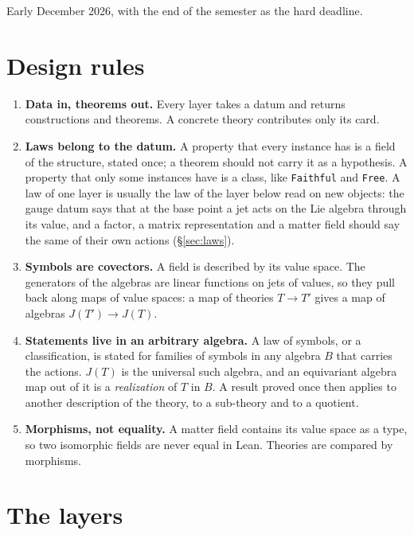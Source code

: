 \documentclass[11pt,a4paper]{article}
\makeatletter
\newcommand{\lean}[1]{{\footnotesize\upshape\ttfamily\nolinkurl{#1}}}
\renewcommand\paragraph{\@startsection{paragraph}{4}{\z@}{1.7ex \@plus .6ex \@minus .2ex}{-0.8em}{\normalfont\normalsize\bfseries}}
\makeatother
\begin{document}
\paragraph{Deadline.} Early December 2026, with the end of the semester as the hard deadline.

\section{Design rules}

\begin{enumerate}[leftmargin=*, itemsep=2pt]
\item \textbf{Data in, theorems out.} Every layer takes a datum and returns constructions and theorems. A concrete theory contributes only its card.
\item \textbf{Laws belong to the datum.} A property that every instance has is a field of the structure, stated once; a theorem should not carry it as a hypothesis. A property that only some instances have is a class, like \lean{Faithful} and \lean{Free}. A law of one layer is usually the law of the layer below read on new objects: the gauge datum says that at the base point a jet acts on the Lie algebra through its value, and a factor, a matrix representation and a matter field should say the same of their own actions (\S\ref{sec:laws}).
\item \textbf{Symbols are covectors.} A field is described by its value space. The generators of the algebras are linear functions on jets of values, so they pull back along maps of value spaces: a map of theories $T\to T'$ gives a map of algebras $J(T')\to J(T)$.
\item \textbf{Statements live in an arbitrary algebra.} A law of symbols, or a classification, is stated for families of symbols in any algebra $B$ that carries the actions. $J(T)$ is the universal such algebra, and an equivariant algebra map out of it is a \emph{realization} of $T$ in $B$. A result proved once then applies to another description of the theory, to a sub-theory and to a quotient.
\item \textbf{Morphisms, not equality.} A matter field contains its value space as a type, so two isomorphic fields are never equal in Lean. Theories are compared by morphisms.
\end{enumerate}

\section{The layers}\label{sec:layers}
\end{document}
